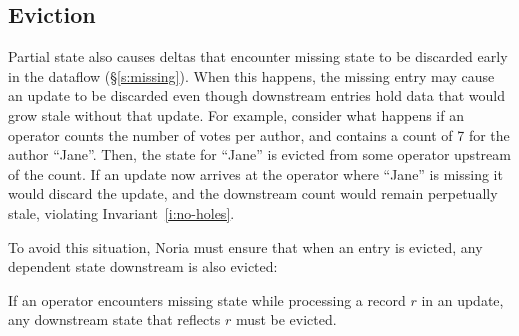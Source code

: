 %
%
%

\subsection{Eviction}

Partial state also causes deltas that encounter missing state to be discarded
early in the dataflow (\S\ref{s:missing}). When this happens, the missing entry
may cause an update to be discarded even though downstream entries hold data
that would grow stale without that update. For example, consider what happens if
an operator counts the number of votes per author, and contains a count of 7 for
the author ``Jane''. Then, the state for ``Jane'' is evicted from some operator
upstream of the count. If an update now arrives at the operator where ``Jane''
is missing it would discard the update, and the downstream count would remain
perpetually stale, violating Invariant~\ref{i:no-holes}.

To avoid this situation, Noria must ensure that when an entry is evicted, any
dependent state downstream is also evicted:

\begin{invariant}
  \label{i:missing-suffix}
  If an operator encounters missing state while processing a record $r$ in an
  update, any downstream state that reflects $r$ must be evicted.
\end{invariant}

